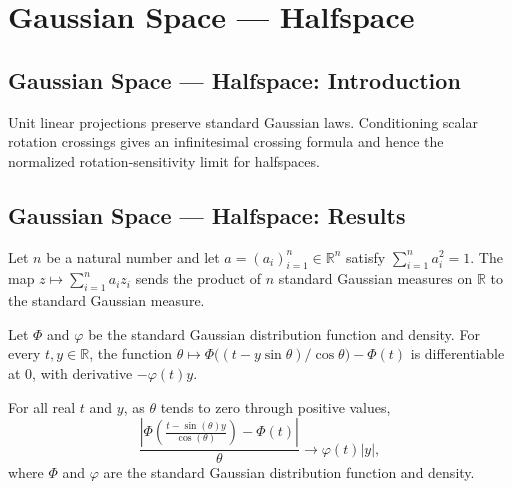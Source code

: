 \section{Gaussian Space --- Halfspace}
\subsection*{Gaussian Space --- Halfspace: Introduction}
Unit linear projections preserve standard Gaussian laws. Conditioning scalar rotation crossings gives an infinitesimal crossing formula and hence the normalized rotation-sensitivity limit for halfspaces.

\subsection*{Gaussian Space --- Halfspace: Results}

\begin{lemma}
\leanok
{}
Let $n$ be a natural number and let $a=(a_i)_{i=1}^n\in\mathbb R^n$ satisfy
$\sum_{i=1}^n a_i^2=1$. The map $z\mapsto\sum_{i=1}^n a_i z_i$ sends the product of $n$
standard Gaussian measures on $\mathbb R$ to the standard Gaussian measure.
\end{lemma}

\begin{lemma}
\leanok
{}
Let $\Phi$ and $\varphi$ be the standard Gaussian distribution function and density. For
every $t,y\in\mathbb R$, the function
$\theta\mapsto\Phi\bigl((t-y\sin\theta)/\cos\theta\bigr)-\Phi(t)$ is differentiable at
$0$, with derivative $-\varphi(t)y$.
\end{lemma}

\begin{lemma}
\leanok
{}
For all real $t$ and $y$, as $\theta$ tends to zero through positive values,
$$\frac{\left|\Phi\left(\frac{t-\sin(\theta)y}{\cos(\theta)}\right)-\Phi(t)\right|}{\theta}\longrightarrow
\varphi(t)|y|,$$ where $\Phi$ and $\varphi$ are the standard Gaussian distribution
function and density.
\end{lemma}

